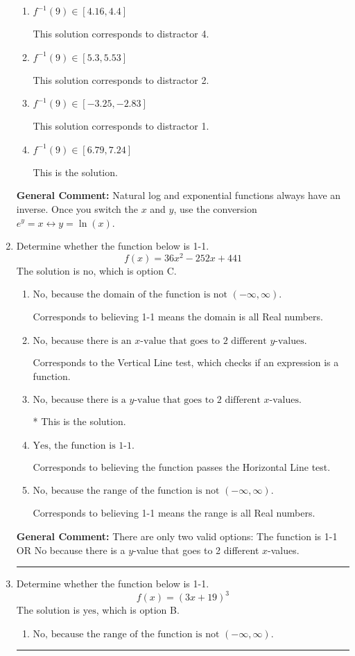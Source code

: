 \documentclass{extbook}[14pt]
\newcommand{\litem}[1]{\item #1

\rule{\textwidth}{0.4pt}}
\begin{document}
\begin{enumerate}
{\begin{enumerate}[label=\Alph*.]
 This solution corresponds to distractor 3.
\item \( f^{-1}(9) \in [4.16, 4.4] \)

 This solution corresponds to distractor 4.
\item \( f^{-1}(9) \in [5.3, 5.53] \)

 This solution corresponds to distractor 2.
\item \( f^{-1}(9) \in [-3.25, -2.83] \)

 This solution corresponds to distractor 1.
\item \( f^{-1}(9) \in [6.79, 7.24] \)

 This is the solution.
\end{enumerate}

\textbf{General Comment:} Natural log and exponential functions always have an inverse. Once you switch the $x$ and $y$, use the conversion $ e^y = x \leftrightarrow y=\ln(x)$.
}
\litem{
Determine whether the function below is 1-1.
\[ f(x) = 36 x^2 - 252 x + 441 \]The solution is \( \text{no} \), which is option C.\begin{enumerate}[label=\Alph*.]
\item \( \text{No, because the domain of the function is not $(-\infty, \infty)$.} \)

Corresponds to believing 1-1 means the domain is all Real numbers.
\item \( \text{No, because there is an $x$-value that goes to 2 different $y$-values.} \)

Corresponds to the Vertical Line test, which checks if an expression is a function.
\item \( \text{No, because there is a $y$-value that goes to 2 different $x$-values.} \)

* This is the solution.
\item \( \text{Yes, the function is 1-1.} \)

Corresponds to believing the function passes the Horizontal Line test.
\item \( \text{No, because the range of the function is not $(-\infty, \infty)$.} \)

Corresponds to believing 1-1 means the range is all Real numbers.
\end{enumerate}

\textbf{General Comment:} There are only two valid options: The function is 1-1 OR No because there is a $y$-value that goes to 2 different $x$-values.
}
\litem{
Determine whether the function below is 1-1.
\[ f(x) = (3 x + 19)^3 \]The solution is \( \text{yes} \), which is option B.\begin{enumerate}[label=\Alph*.]
\item \( \text{No, because the range of the function is not $(-\infty, \infty)$.} \)


\end{enumerate}}
\end{enumerate}
\end{document}
